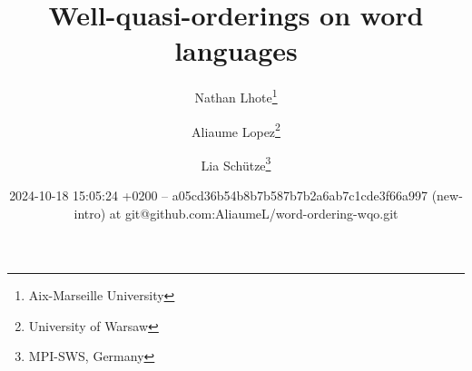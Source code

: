%

\title{Well-quasi-orderings on word languages}
\author{%
        Nathan Lhote\thanks{Aix-Marseille University}
     \and
        Aliaume Lopez\thanks{University of Warsaw}
     \and
        Lia Schütze\thanks{MPI-SWS, Germany}
    }

\date{2024-10-18 15:05:24
+0200 -- a05cd36b54b8b7b587b7b2a6ab7c1cde3f66a997 (new-intro) at git@github.com:AliaumeL/word-ordering-wqo.git}

\newcommand{\makeabstract}{
\begin{abstract}
    The set of finite words over a well-quasi-ordered set is itself
    well-quasi-ordered. This seminal result by Higman is a cornerstone
    of the theory of well-quasi-orderings and has found numerous
    applications in computer science. However, this result is based on a
    specific choice of ordering on words, the (scattered) subword
    ordering. In this paper, we describe to what extent other natural
    orderings (prefix, suffix, and infix) on words can be used to derive
    Higman-like theorems. More specifically, we are interested in
    characterizing \emph{languages} of words that are well-quasi-ordered
    under these orderings. We show that a simple characterization is
    possible for the prefix and suffix orderings, and that under extra
    regularity assumptions, this also extends to the infix ordering.
\end{abstract}
}
